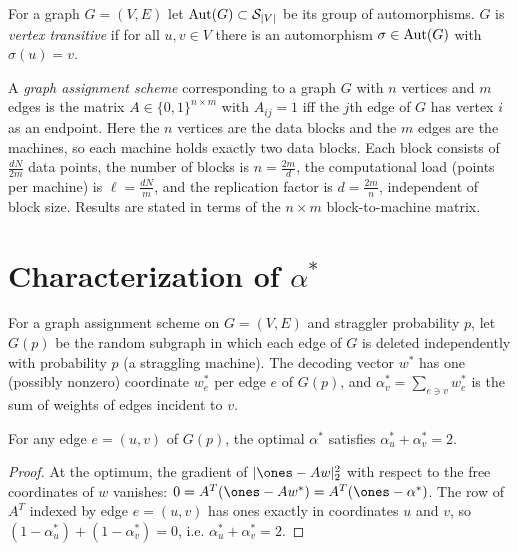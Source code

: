 \begin{definition}
  \label{def:vertex-transitive}
  For a graph $G = (V,E)$ let $\operatorname{Aut}(G) \subset \mathcal{S}_{|V|}$ be its group of
  automorphisms. $G$ is \emph{vertex transitive} if for all $u, v \in V$ there
  is an automorphism $\sigma \in \operatorname{Aut}(G)$ with $\sigma(u) = v$.
\end{definition}

\begin{definition}
  \label{def:graph-assignment}
  A \emph{graph assignment scheme} corresponding to a graph $G$ with $n$ vertices
  and $m$ edges is the matrix $A \in \{0,1\}^{n \times m}$ with $A_{ij} = 1$ iff
  the $j$th edge of $G$ has vertex $i$ as an endpoint. Here the $n$ vertices are
  the data blocks and the $m$ edges are the machines, so each machine holds
  exactly two data blocks. Each block consists of $\tfrac{dN}{2m}$ data points,
  the number of blocks is $n = \tfrac{2m}{d}$, the computational load (points per
  machine) is $\ell = \tfrac{dN}{m}$, and the replication factor is
  $d = \tfrac{2m}{n}$, independent of block size. Results are stated in terms of
  the $n \times m$ block-to-machine matrix.
\end{definition}

\chapter{Characterization of $\alpha^*$}


\begin{definition}
  \label{def:sparsification}
  For a graph assignment scheme on $G = (V,E)$ and straggler probability $p$,
  let $G(p)$ be the random subgraph in which each edge of $G$ is deleted
  independently with probability $p$ (a straggling machine). The decoding vector
  $w^*$ has one (possibly nonzero) coordinate $w^*_e$ per edge $e$ of $G(p)$, and
  $\alpha^*_v = \sum_{e \ni v} w^*_e$ is the sum of weights of edges incident to
  $v$.
\end{definition}

\begin{lemma}
  \label{lem:alpha-edge-sum}
  For any edge $e = (u,v)$ of $G(p)$, the optimal $\alpha^*$ satisfies
  $\alpha^*_u + \alpha^*_v = 2$.
\end{lemma}
\begin{proof}
  At the optimum, the gradient of $|\ones - Aw|_2^2$ with respect to the free
  coordinates of $w$ vanishes: $0 = A^T(\ones - Aw^*) = A^T(\ones - \alpha^*)$.
  The row of $A^T$ indexed by edge $e = (u,v)$ has ones exactly in coordinates
  $u$ and $v$, so $(1 - \alpha^*_u) + (1 - \alpha^*_v) = 0$, i.e.
  $\alpha^*_u + \alpha^*_v = 2$.
\end{proof}

